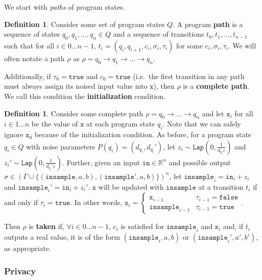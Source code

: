 \documentclass[12pt]{article}
\newcommand{\RR}{\mathbb{R}}
\newcommand{\Lap}{\texttt{Lap}}
\theoremstyle{definition}
\newtheorem{defn}[thm]{Definition}
\begin{document}
We start with \textit{paths} of program states. 

\begin{defn}
    Consider some set of program states $Q$. A program \textbf{path} is a sequence of states $q_0, q_1, \ldots, q_n\in Q$ and a sequence of transitions $t_0, t_1, \ldots, t_{n-1}$ such that for all $i\in 0\ldots n-1$, $t_i = (q_i, q_{i+1}, c_i, \sigma_i, \tau_i)$ for some $c_i, \sigma_i, \tau_i$. We will often notate a path $\rho$ as $\rho = q_0\to q_1\to \ldots \to q_n$. 
    
    Additionally, if $\tau_0 = \texttt{true}$ and $c_0 = \texttt{true}$ (i.e.\ the first transition in any path must always assign its noised input value into $\texttt{x}$), then $\rho$ is a \textbf{complete path}. We call this condition the \textbf{initialization} condition.
\end{defn}
\begin{defn}
    Consider some complete path $\rho = q_0\to \ldots \to q_n$ and let $\texttt{x}_i$ for all $i\in 1\ldots n$ be the value of $\texttt{x}$ at each program state $q_i$. Note that we can safely ignore $\texttt{x}_0$ because of the initialization condition. As before, for a program state $q_i\in Q$ with noise parameters $P({q_i}) = (d_{q_i}, d_{q_i}')$, let $z_i\sim \Lap(0, \frac{1}{d_{q_i}\varepsilon})$ and $z_i'\sim\Lap(0, \frac{1}{d_{q_i}'\varepsilon})$. 
    Further, given an input $\texttt{in}\in \RR^n$ and possible output $\sigma \in (\Gamma\cup\{(\texttt{insample}, a, b), (\texttt{insample}', a, b)\})^n$, let $\texttt{insample}_i = \texttt{in}_i+z_i$ and $\texttt{insample}_i' = \texttt{in}_i+z_i'$. $\texttt{x}$ will be updated with $\texttt{insample}$ at a transition $t_i$ if and only if $\tau_i = \texttt{true}$. In other words, $\texttt{x}_i = \begin{cases}
        \texttt{x}_{i-1} & \tau_{i-1} =\texttt{false}\\
        \texttt{insample}_{i-1} &\tau_{i-1}=\texttt{true}
    \end{cases}$. 

    Then $\rho$ is \textbf{taken} if, $\forall i\in 0\ldots n-1$, $c_i$ is satisfied for $\texttt{insample}_i$ and $\texttt{x}_i$ and, if $t_i$ outputs a real value, it is of the form $(\texttt{insample}_i, a, b)$ or $(\texttt{insample}_i', a', b')$, as appropriate. 
\end{defn}

\subsubsection{Privacy}
\end{document}
